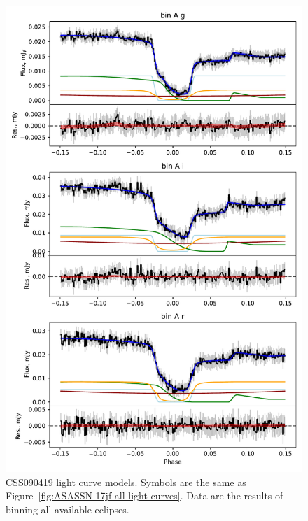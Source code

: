 \begin{figure}
    \centering
    \includegraphics[width=\textwidth]{figures/results/CSS090419/CSS090419_1.pdf}
    \caption{CSS090419 light curve models. Symbols are the same as Figure~\ref{fig:ASASSN-17jf all light curves}. Data are the results of binning all available eclipses.}
    \label{fig:CSS090419 all light curves}
\end{figure}
